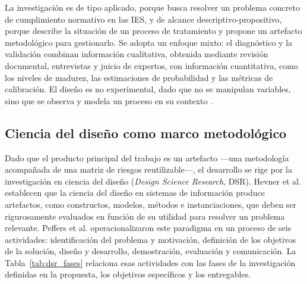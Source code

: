 La investigación es de tipo aplicado, porque busca resolver un problema concreto de cumplimiento normativo en las IES, y de alcance descriptivo-propositivo, porque describe la situación de un proceso de tratamiento y propone un artefacto metodológico para gestionarlo. Se adopta un enfoque mixto: el diagnóstico y la validación combinan información cualitativa, obtenida mediante revisión documental, entrevistas y juicio de expertos, con información cuantitativa, como los niveles de madurez, las estimaciones de probabilidad y las métricas de calibración. El diseño es no experimental, dado que no se manipulan variables, sino que se observa y modela un proceso en su contexto \cite{hernandez2018metodologia}.

\subsection{Ciencia del diseño como marco metodológico}

Dado que el producto principal del trabajo es un artefacto ---una metodología acompañada de una matriz de riesgos reutilizable---, el desarrollo se rige por la investigación en ciencia del diseño (\textit{Design Science Research}, DSR). Hevner et al. \cite{hevner2004design} establecen que la ciencia del diseño en sistemas de información produce artefactos, como constructos, modelos, métodos e instanciaciones, que deben ser rigurosamente evaluados en función de su utilidad para resolver un problema relevante. Peffers et al. \cite{peffers2007dsrm} operacionalizaron este paradigma en un proceso de seis actividades: identificación del problema y motivación, definición de los objetivos de la solución, diseño y desarrollo, demostración, evaluación y comunicación. La Tabla~\ref{tab:dsr_fases} relaciona esas actividades con las fases de la investigación definidas en la propuesta, los objetivos específicos y los entregables.

